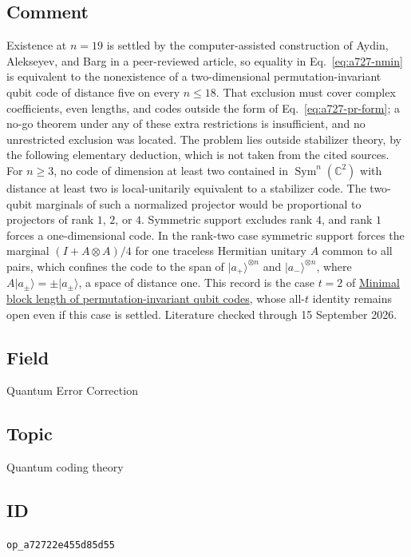 \subsection*{Comment}

Existence at $n=19$ is settled by the computer-assisted construction of Aydin,
Alekseyev, and Barg in a peer-reviewed article, so equality in
Eq.~\eqref{eq:a727-nmin} is equivalent to the nonexistence of a
two-dimensional permutation-invariant qubit code of distance five on every
$n\leq18$.  That exclusion must cover complex coefficients, even lengths, and
codes outside the form of Eq.~\eqref{eq:a727-pr-form}; a no-go theorem under any
of these extra restrictions is insufficient, and no unrestricted exclusion was
located.  The problem lies outside stabilizer theory, by the following
elementary deduction, which is not taken from the cited sources.  For $n\geq3$,
no code of dimension at least two contained in
$\operatorname{Sym}^n(\mathbb C^2)$ with distance at least two is
local-unitarily equivalent to a stabilizer code.  The two-qubit marginals of
such a normalized projector would be proportional to projectors of rank $1$,
$2$, or $4$.  Symmetric support excludes rank $4$, and rank $1$ forces a
one-dimensional code.  In the rank-two case symmetric support forces the
marginal $(I+A\otimes A)/4$ for one traceless Hermitian unitary $A$ common to
all pairs, which confines the code to the span of
$\lvert a_+\rangle^{\otimes n}$ and $\lvert a_-\rangle^{\otimes n}$, where
$A\lvert a_\pm\rangle=\pm\lvert a_\pm\rangle$, a space of distance one.  This
record is the case $t=2$ of
\href{https://qiqc-op.com/problem/op_2fba72464e1b4de4/}{Minimal block length of permutation-invariant qubit codes},
whose all-$t$ identity remains open even if this case is settled.  Literature
checked through 15 September 2026.

\subsection*{Field}

Quantum Error Correction

\subsection*{Topic}

Quantum coding theory

\subsection*{ID}

\texttt{op\_a72722e455d85d55}
